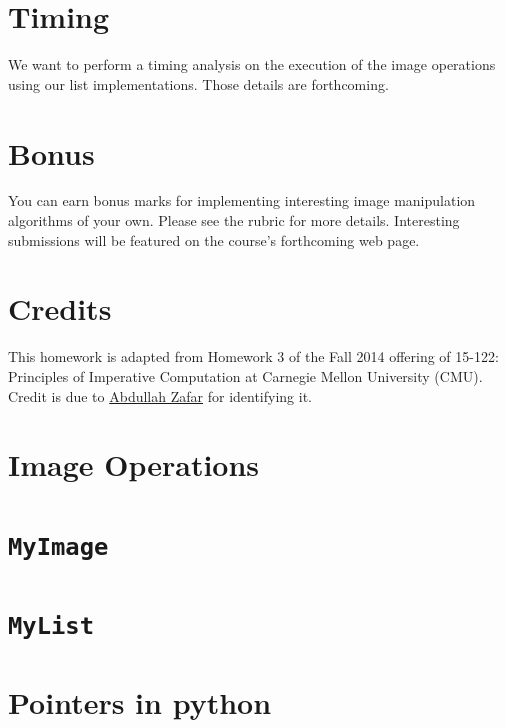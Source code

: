 \documentclass[addpoints]{exam}
\begin{document}
\section{Timing}

We want to perform a timing analysis on the execution of the image operations using our list implementations. Those details are forthcoming.

\section{Bonus}

You can earn bonus marks for implementing interesting image manipulation algorithms of your own. Please see the rubric for more details. Interesting submissions will be featured on the course's forthcoming web page.

\section{Credits}

This homework is adapted from Homework 3 of the Fall 2014 offering of 15-122: Principles of Imperative Computation at Carnegie Mellon University (CMU). Credit is due to \href{https://www.facebook.com/abdullah.zafar.547389}{Abdullah Zafar} for identifying it.

\newpage
\appendix
\section{Image Operations}


\newpage
\section{\texttt{MyImage}}


\newpage
\section{\texttt{MyList}}


\newpage
\section{Pointers in python}




\end{document}
